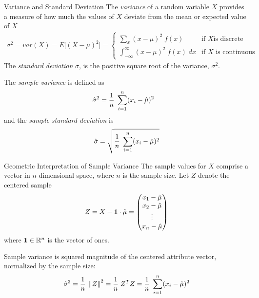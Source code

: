 \begin{frame}{Variance and Standard Deviation}
The {\em variance}
of a random variable $X$ provides a measure of how
much the values of $X$ deviate from the mean or expected value of
$X$
\begin{align*}
      \sigma^2 = var(X) = E\bigl[(X-\mu)^2\bigr] =
    \begin{cases}
     \displaystyle \sum_{x} (x - \mu)^2 \; f(x) & \text{if $X$
     is discrete} \\[2em]
    \displaystyle \int_{-\infty}^{\infty} (x - \mu)^2 \;
    f(x)\; dx & \text{if $X$ is continuous}
\end{cases}
\end{align*}
The {\em standard deviation} $\sigma$,
is the positive square root of the variance, $\sigma^2$.

\bigskip
The {\em sample variance}  is
def\/{i}ned as
\begin{align*}
    \hat{\sigma}^2 & = \frac{1}{n}\;\sum_{i=1}^n (x_i - \hat{\mu})^2
\end{align*}
and the {\em sample standard deviation} is
\begin{align*}
    \hat{\sigma} = \sqrt{\frac{1}{n}\;\sum_{i=1}^n
  (x_i - \hat{\mu})^2}
\end{align*}
\end{frame}


\begin{frame}{Geometric Interpretation of Sample Variance}
The sample values for $X$ comprise a vector in
$n$-dimensional space, where $n$ is the sample size. 
Let $Z$ denote the centered sample 
$$Z = X- \bone \cdot \hmu = \matr{x_1 -\hmu\\x_2-\hmu\\ \vdots \\ x_n-\hmu}$$
where 
$\mathbf{1} \in {\mathord{\mathbb R}}^n$ is the vector of ones.

Sample variance is 
squared
magnitude of the centered attribute vector, normalized by the sample
size:
\begin{align*}
    \hat{\sigma}^2 = \frac{1}{n}\;\left\lVert Z\right\rVert^2 =
    \frac{1}{n}\;Z^T Z = \frac{1}{n}\;\sum_{i=1}^n
    (x_i-\hat{\mu})^2
\end{align*}
\end{frame}


